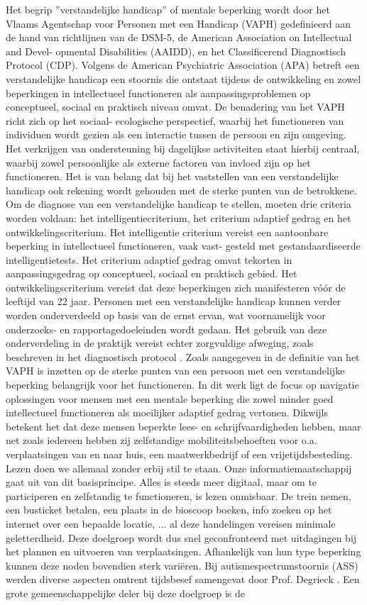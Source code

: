 Het begrip ”verstandelijke handicap” of mentale beperking wordt door het Vlaams Agentschap voor Personen met een Handicap (VAPH) gedefinieerd aan de hand van richtlijnen van de DSM-5, de American Association on Intellectual and Devel- opmental Disabilities (AAIDD), en het Classificerend Diagnostisch Protocol (CDP). Volgens de American Psychiatric Association (APA) betreft een verstandelijke handicap een stoornis die ontstaat tijdens de ontwikkeling en zowel beperkingen in intellectueel functioneren als aanpassingsproblemen op conceptueel, sociaal en praktisch niveau omvat. De benadering van het VAPH richt zich op het sociaal- ecologische perspectief, waarbij het functioneren van individuen wordt gezien als een interactie tussen de persoon en zijn omgeving. Het verkrijgen van ondersteuning bij dagelijkse activiteiten staat hierbij centraal, waarbij zowel persoonlijke als externe factoren van invloed zijn op het functioneren. Het is van belang dat bij het vaststellen van een verstandelijke handicap ook rekening wordt gehouden met de sterke punten van de betrokkene. Om de diagnose van een verstandelijke handicap te stellen, moeten drie criteria worden voldaan: het intelligentiecriterium, het criterium adaptief gedrag en het ontwikkelingscriterium. Het intelligentie criterium vereist een aantoonbare beperking in intellectueel functioneren, vaak vast- gesteld met gestandaardiseerde intelligentietests. Het criterium adaptief gedrag omvat tekorten in aanpassingsgedrag op conceptueel, sociaal en praktisch gebied. Het ontwikkelingscriterium vereist dat deze beperkingen zich manifesteren vóór de leeftijd van 22 jaar. Personen met een verstandelijke handicap kunnen verder worden onderverdeeld op basis van de ernst ervan, wat voornamelijk voor onderzoeks- en rapportagedoeleinden wordt gedaan. Het gebruik van deze onderverdeling in de praktijk vereist echter zorgvuldige afweging, zoals beschreven in het diagnostisch protocol \autocite{VAPH}. Zoals aangegeven in de definitie van het VAPH is inzetten op de sterke punten van een persoon met een verstandelijke beperking belangrijk voor het functioneren. In dit werk ligt de focus op navigatie oplossingen voor mensen met een mentale beperking die zowel minder goed intellectueel functioneren als moeilijker adaptief gedrag vertonen. Dikwijls betekent het dat deze mensen beperkte lees- en schrijfvaardigheden hebben, maar net zoals iedereen hebben zij zelfstandige mobiliteitsbehoeften voor o.a. verplaatsingen van en naar huis, een maatwerkbedrijf of een vrijetijdsbesteding. Lezen doen we allemaal zonder erbij stil te staan. Onze informatiemaatschappij gaat uit van dit basisprincipe. Alles is steeds meer digitaal, maar om te participeren en zelfstandig te functioneren, is lezen onmisbaar. De trein nemen, een busticket betalen, een plaats in de bioscoop boeken, info zoeken op het internet over een bepaalde locatie, ... al deze handelingen vereisen minimale geletterdheid. Deze doelgroep wordt dus snel geconfronteerd met uitdagingen bij het plannen en uitvoeren van verplaatsingen. Afhankelijk van hun type beperking kunnen deze noden bovendien sterk variëren. Bij autismespectrumstoornis (ASS) werden diverse aspecten omtrent tijdsbesef samengevat door Prof. Degrieck \autocite{Degrieck2014}. Een grote gemeenschappelijke deler bij deze doelgroep is de 